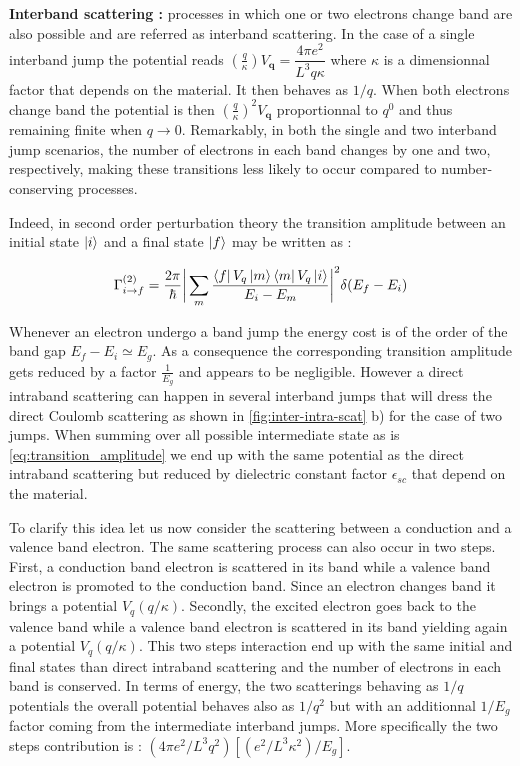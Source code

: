 \bigskip

\textbf{Interband scattering :}
processes in which one or two electrons change band are also possible and are referred as interband scattering. In the case of a single 
interband jump the potential reads $(\frac{q}{\kappa})V_{\textbf{q}}= \dfrac{4\pi e^2}{L^3 q \kappa}$ where $\kappa$ is a dimensionnal factor that depends on the material. It then behaves as $1/q$. When both electrons change band the potential is then $(\frac{q}{\kappa})^2V_{\textbf{q}}$ proportionnal to $q^0$
and thus remaining finite when $q\to 0$. Remarkably, in both the single and two interband jump scenarios, the number of electrons in each band changes by one and two, respectively, making these transitions less likely to occur compared to number-conserving processes.

\bigskip
Indeed, in second order perturbation theory the transition amplitude between an initial state $\ket{i}$ and a final state $\ket{f}$ may be written as :

\begin{equation}
    \Gamma_{i\to f}^{(2)} = \dfrac{2\pi}{\hbar} \bigg \vert \sum_{m} \dfrac{\bra{f}V_q\ket{m}\bra{m}V_q\ket{i}}{E_i - E_m}\bigg \vert^2 \delta(E_f - E_i)
    \label{eq:transition_amplitude}
\end{equation}

\noindent Whenever an electron undergo a band jump the energy cost is of the order of the band gap $E_f - E_i \simeq E_g$. As a consequence the corresponding transition amplitude gets reduced by a factor $\frac{1}{E_g}$ and appears to be negligible.
 However a direct intraband scattering can happen in several interband jumps that will dress the direct Coulomb scattering as shown in \autoref{fig:inter-intra-scat} b) for the case of two jumps. When summing over all possible intermediate state as is \eqref{eq:transition_amplitude} we end up with the same potential as the direct intraband scattering but reduced by dielectric constant factor $\epsilon_{sc}$ that depend on the material.

 
\bigskip




To clarify this idea let us now consider the scattering between a conduction and a valence band electron. 
The same scattering process can also occur in two steps. First, a conduction band electron is scattered in its band while a valence band electron is promoted to the conduction band. Since an electron changes band it brings a potential $V_q(q/\kappa)$. Secondly, 
 the excited electron goes back to the valence band while a valence band electron is scattered in its band yielding again a potential $V_q(q/\kappa)$. This two steps interaction end up with the same initial and final states than direct intraband scattering and the number of electrons in each band is conserved.  
In terms of energy, the two scatterings behaving as $1/q$ potentials the overall potential behaves also as $1/q^2$ but with an additionnal $1/E_{g}$ factor coming from the intermediate interband jumps. More specifically the two steps contribution is : $\left( 4\pi e^2/L^3q^2 \right)\left[ (e^2/L^3\kappa^2)/E_{g}\right]$.  

